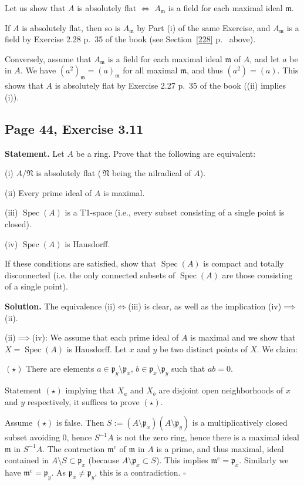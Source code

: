 \documentclass[parskip=half,fontsize=12pt]{scrartcl}%
\newcommand{\oo}{\operatorname}\newcommand{\ooo}{\operatorname*}
\newcommand{\mf}{\mathfrak}
\newcommand{\mmm}{\mf m}
\newcommand{\ppp}{\mf p}
\newcommand{\Spec}{\operatorname{Spec}}\newcommand{\Sp}{\operatorname{Spec}}
\begin{document}
Let us show that $A$ is absolutely flat $\iff$ $A_\mmm$ is a field for each maximal ideal $\mmm$. 

If $A$ is absolutely flat, then so is $A_\mmm$ by Part (i) of the same Exercise, and $A_\mmm$ is a field by Exercise 2.28 p.~35 of the book (see Section~\ref{228} p.~\pageref{228} above). 

Conversely, assume that $A_\mmm$ is a field for each maximal ideal $\mmm$ of $A$, and let $a$ be in $A$. We have $(a^2)_\mmm=(a)_\mmm$ for all maximal $\mmm$, and thus $(a^2)=(a)$. This shows that $A$ is absolutely flat by Exercise 2.27 p.~35 of the book ((ii) implies (i)).

\subsection{Page 44, Exercise 3.11}%

\textbf{Statement.} Let $A$ be a ring. Prove that the following are equivalent:

(i) $A/\mf N$ is absolutely flat ($\,\mf N$ being the nilradical of $A$).

(ii) Every prime ideal of $A$ is maximal.

(iii)  $\Spec(A)$ is a T1-space (i.e., every subset consisting of a single point is closed).

(iv) $\Spec(A)$ is Hausdorff.

If these conditions are satisfied, show that $\Spec(A)$ is compact and totally disconnected (i.e. the only connected subsets of $\Spec(A)$ are those consisting of a single point).

\textbf{Solution.} The equivalence (ii)$\iff$(iii) is clear, as well as the implication (iv)$\implies$(ii).

(ii)$\implies$(iv): We assume that each prime ideal of $A$ is maximal and we show that $X=\Spec(A)$ is Hausdorff. Let $x$ and $y$ be two distinct points of $X$. We claim:

$(\star)$ There are elements $a\in\ppp_y\setminus\ppp_x$, $b\in\ppp_x\setminus\ppp_y$ such that $ab=0$.

Statement $(\star)$ implying that $X_a$ and $X_b$ are disjoint open neighborhoods of $x$ and $y$ respectively, it suffices to prove $(\star)$.

Assume $(\star)$ is false. Then $S:=(A\setminus\ppp_x)(A\setminus\ppp_y)$ is a multiplicatively closed subset avoiding $0$, hence $S^{-1}A$ is not the zero ring, hence there is a maximal ideal $\mmm$ in $S^{-1}A$. The contraction $\mmm^{\oo c}$ of $\mmm$ in $A$ is a prime, and thus maximal, ideal contained in $A\setminus S\subset\ppp_x$ (because $A\setminus\ppp_x\subset S$). This implies $\mmm^{\oo c}=\ppp_x$. Similarly we have $\mmm^{\oo c}=\ppp_y$. As $\ppp_x\ne\ppp_y$, this is a contradiction. %
$\square$
\end{document}
